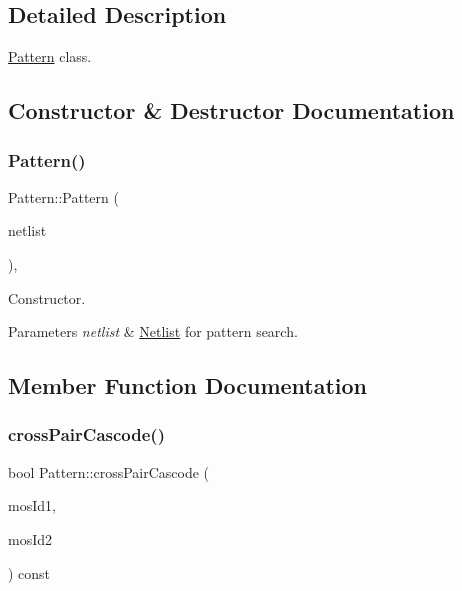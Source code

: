 \subsection{Detailed Description}
\hyperlink{classPattern}{Pattern} class. 

\subsection{Constructor \& Destructor Documentation}
\mbox{\label{classPattern_a11345fc22f0ff9a01cff037c5a3e5115}} 
\subsubsection{\texorpdfstring{Pattern()}{Pattern()}}
{\footnotesize\ttfamily Pattern\+::\+Pattern (\begin{DoxyParamCaption}\item[{const \hyperlink{classNetlist}{Netlist} \&}]{netlist }\end{DoxyParamCaption})\hspace{0.3cm}{\ttfamily [inline]}, {\ttfamily [explicit]}}



Constructor. 


\begin{DoxyParams}{Parameters}
{\em netlist} & \hyperlink{classNetlist}{Netlist} for pattern search. \\
\hline
\end{DoxyParams}


\subsection{Member Function Documentation}
\mbox{\label{classPattern_a371cef1fc7d0c4d5b291d80dc5c4b777}} 
\subsubsection{\texorpdfstring{cross\+Pair\+Cascode()}{crossPairCascode()}}
{\footnotesize\ttfamily bool Pattern\+::cross\+Pair\+Cascode (\begin{DoxyParamCaption}\item[{\hyperlink{type_8h_a581e8093e28e7362f2b6937296190676}{Index\+Type}}]{mos\+Id1,  }\item[{\hyperlink{type_8h_a581e8093e28e7362f2b6937296190676}{Index\+Type}}]{mos\+Id2 }\end{DoxyParamCaption}) const\hspace{0.3cm}{\ttfamily [private]}}



